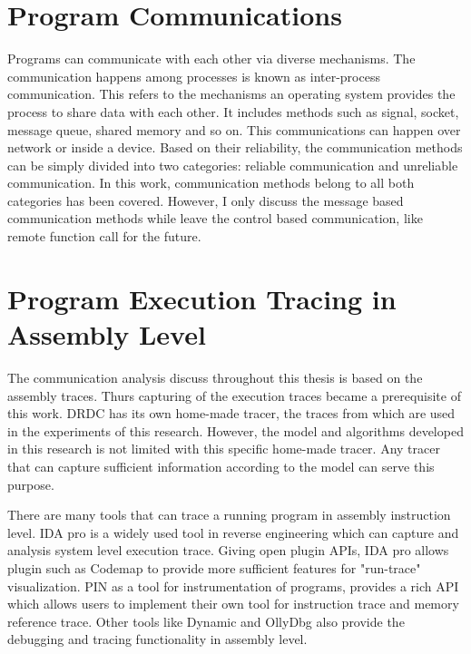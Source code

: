 \section{Program Communications}
Programs can communicate with each other via diverse mechanisms. The communication happens among processes is known as inter-process communication. This refers to the mechanisms an operating system provides the process to share data with each other. It includes methods such as signal, socket, message queue, shared memory and so on.\cite{garrido2000inter} This communications can happen over network or inside a device. Based on their reliability, the communication methods can be simply divided into two categories: reliable communication and unreliable communication. In this work, communication methods belong to all both categories has been covered. However, I only discuss the message based communication methods while leave the control based communication, like remote function call for the future.

\section{Program Execution Tracing in Assembly Level}
The communication analysis discuss throughout this thesis is based on the assembly traces. Thurs capturing of the execution traces became a prerequisite of this work. DRDC has its own home-made tracer, the traces from which are used in the experiments of this research. However, the model and algorithms developed in this research is not limited with this specific home-made tracer. Any tracer that can capture sufficient information according to the model can serve this purpose.

There are many tools that can trace a running program in assembly instruction level.  IDA pro \cite{eagle_ida_2008} is a widely used tool in reverse engineering which can capture and analysis system level execution trace. Giving open plugin APIs, IDA pro allows plugin such as Codemap \cite{_c0demap/codemap:_????} to provide more sufficient features for "run-trace" visualization. PIN\cite{_pin_????} as a tool for instrumentation of programs, provides a rich API which allows users to implement their own tool for instruction trace and memory reference trace. Other tools like Dynamic \cite{brueningqz} and OllyDbg\cite{yuschuk2007ollydbg} also provide the debugging and tracing functionality in assembly level. 

